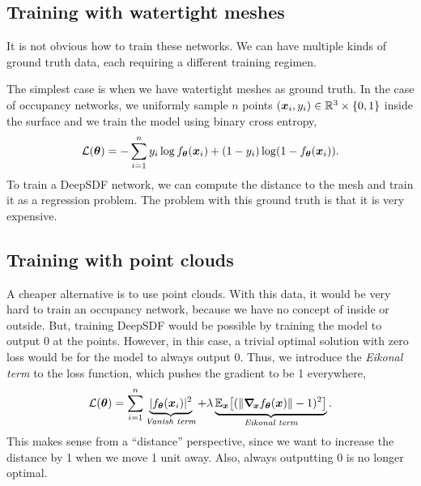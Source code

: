 \subsection{Training with watertight meshes}

It is not obvious how to train these networks. We can have multiple kinds of ground truth data,
each requiring a different training regimen.

The simplest case is when we have watertight meshes as ground truth. In the case of
occupancy networks, we uniformly sample $n$ points $(\bm{x}_i, y_i) \in \mathbb{R}^3 \times \{0,1\}$
inside the surface and we train the model using binary cross entropy, \[
    \mathcal{L}(\vec{\theta}) = - \sum_{i=1}^{n} y_i \log f_{\vec{\theta}}\lft(\vec{x}_i\rgt) + \lft(1-y_i\rgt) \log \lft(1-f_{\vec{\theta}}\lft(\vec{x}_i\rgt)\rgt).
\]
To train a DeepSDF network, we can compute the distance to the mesh and train it as a regression
problem. The problem with this ground truth is that it is very expensive.

\subsection{Training with point clouds}


A cheaper alternative is to use point clouds. With this data, it would be very hard to train an
occupancy network, because we have no concept of inside or outside. But, training DeepSDF would be
possible by training the model to output 0 at the points. However, in this case, a trivial optimal
solution with zero loss would be for the model to always output 0. Thus, we introduce the
\textit{Eikonal term} \citep{gropp2020implicit} to the loss function, which pushes the gradient to
be 1 everywhere, \[
    \mathcal{L}(\vec{\theta}) = \sum_{i=1}^{n} \underbrace{|f_{\vec{\theta}}(\vec{x}_i)|^2}_{\textit{Vanish term}} + \lambda \underbrace{\E_{\vec{x}}\lft[(\| \grad{f_{\vec{\theta}}(\vec{x})}{\vec{x}}\| - 1)^2\rgt]}_{\textit{Eikonal term}}.
\]
This makes sense from a ``distance'' perspective, since we want to increase the distance by 1 when
we move 1 unit away. Also, always outputting 0 is no longer optimal.

